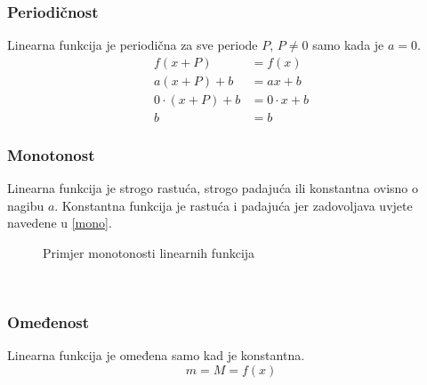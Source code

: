 \subsubsection{Periodičnost \lin}
    Linearna funkcija je periodična za sve periode \(P\), \(P \neq 0\) samo kada je \(a = 0\).
    \begin{equation*}
        \begin{split}
            f(x + P)        & = f(x) \\
            a(x + P) + b    & = ax + b \\
            0 \cdot (x + P) + b & = 0 \cdot x + b \\
            b               & = b
        \end{split}
    \end{equation*}

\subsubsection{Monotonost \lin}
    Linearna funkcija je strogo rastuća, strogo padajuća ili konstantna ovisno o nagibu \(a\). 
    Konstantna funkcija je rastuća i padajuća jer zadovoljava uvjete navedene u \ref{mono}.
    \begin{figure}[ht]
        \centering
        \caption{Primjer monotonosti linearnih funkcija} 
        \label{fig:template}
    \end{figure}
    \\

\subsubsection{Omeđenost \lin}
    Linearna funkcija je omeđena samo kad je konstantna.
    \[m = M = f(x)\]

